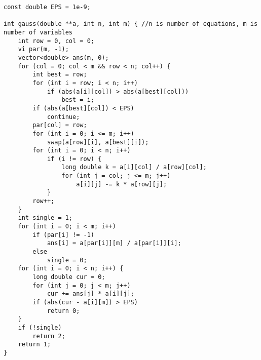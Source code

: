 \begin{verbatim}
const double EPS = 1e-9;

int gauss(double **a, int n, int m) { //n is number of equations, m is number of variables
	int row = 0, col = 0;
	vi par(m, -1);
	vector<double> ans(m, 0);
	for (col = 0; col < m && row < n; col++) {
		int best = row;
		for (int i = row; i < n; i++)
			if (abs(a[i][col]) > abs(a[best][col]))
				best = i;
		if (abs(a[best][col]) < EPS)
			continue;
		par[col] = row;
		for (int i = 0; i <= m; i++)
			swap(a[row][i], a[best][i]);
		for (int i = 0; i < n; i++)
			if (i != row) {
				long double k = a[i][col] / a[row][col];
				for (int j = col; j <= m; j++)
					a[i][j] -= k * a[row][j];
			}
		row++;
	}
	int single = 1;
	for (int i = 0; i < m; i++)
		if (par[i] != -1)
			ans[i] = a[par[i]][m] / a[par[i]][i];
		else
			single = 0;
	for (int i = 0; i < n; i++) {
		long double cur = 0;
		for (int j = 0; j < m; j++)
			cur += ans[j] * a[i][j];
		if (abs(cur - a[i][m]) > EPS)
			return 0;
	}
	if (!single)
		return 2;
	return 1;
}
\end{verbatim}
